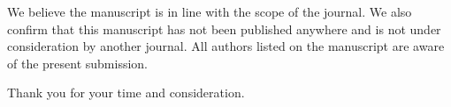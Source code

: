 \documentclass[11pt,a4paper,roman]{moderncv}        %
\begin{document}
	We believe the manuscript is in line with the scope of the journal. We also confirm that this manuscript has not been published anywhere and is not under consideration by another journal. All authors listed on the manuscript are aware of the present submission.
	
	Thank you for your time and consideration.
	
	\makeletterclosing
	
\end{document}
